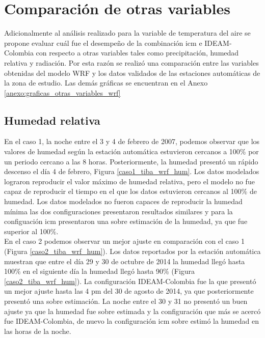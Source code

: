 \section{Comparación de otras variables}

Adicionalmente al análisis realizado para la variable de temperatura del aire se propone evaluar cuál fue el desempeño de la combinación icm e IDEAM-Colombia con respecto a otras variables tales como precipitación, humedad relativa y radiación. Por esta razón se realizó una comparación entre las variables obtenidas del modelo WRF y los datos validados de las estaciones automáticas de la zona de estudio. Las demás gráficas se encuentran en el Anexo \ref{anexo:graficas_otras_variables_wrf}\\

\subsection{Humedad relativa}


En el caso 1, la noche entre el 3 y 4 de febrero de 2007, podemos observar que los valores de humedad según la estación automática estuvieron cercanos a 100\% por un periodo cercano a las 8 horas. Posteriormente, la humedad presentó un rápido descenso el día 4 de febrero, Figura \ref{caso1_tiba_wrf_hum}. Los datos modelados lograron reproducir el valor máximo de humedad relativa, pero el modelo no fue capaz de reproducir el tiempo en el que los datos estuvieron cercanos al 100\% de humedad. Los datos modelados no fueron capaces de reproducir la humedad mínima las dos configuraciones presentaron resultados similares y para la configuación icm presentaron una sobre estimación de la humedad, ya que fue superior al 100\%.\\

En el caso 2 podemos observar un mejor ajuste en comparación con el caso 1 (Figura \ref{caso2_tiba_wrf_hum}). Los datos reportados por la estación automática muestran que entre el día 29 y 30 de octubre de 2014 la humedad llegó hasta 100\% en el siguiente día la humedad llegó hasta 90\% (Figura \ref{caso2_tiba_wrf_hum}). La configuración IDEAM-Colombia fue la que presentó un mejor ajuste hasta las 4 pm del 30 de agosto de 2014, ya que posteriormente presentó una sobre estimación. La noche entre el 30 y 31 no presentó un buen ajuste ya que la humedad fue sobre estimada y la configuración que más se acercó fue IDEAM-Colombia, de nuevo la configuración icm sobre estimó la humedad en las horas de la noche.\\

